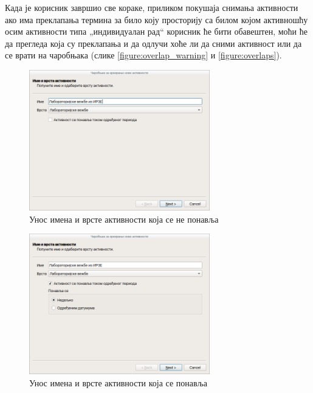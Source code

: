 \documentclass[a4paper, 12pt, diplomski]{etfcyr}
\def\quote#1{„#1“}
\begin{document}
\begin{justify}
					Када је корисник завршио све кораке, приликом покушаја снимања активности ако има преклапања термина за било коју просторију са билом којом активношћу осим активности типа \quote{индивидуалан рад} корисник ће бити обавештен, моћи ће да прегледа која су преклапања и да одлучи хоће ли да сними активност или да се врати на чаробњака (слике \ref{figure:overlap_warning} и \ref{figure:overlaps}).

					\begin{figure}[H]
						\begin{center}
							\includegraphics[width=0.70\textwidth]{manual/activity_wizard_name_and_type.png}
						\end{center}
						\caption{Унос имена и врсте активности која се не понавља}
						\label{figure:single_name_and_type}
					\end{figure}
					\begin{figure}[H]
						\begin{center}
							\includegraphics[width=0.70\textwidth]{manual/activity_wizard_name_and_type_repetitive.png}
						\end{center}
						\caption{Унос имена и врсте активности која се понавља}

\end{figure}
\end{justify}
\end{document}
